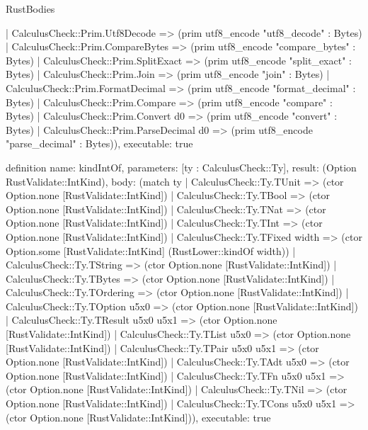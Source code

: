 \begin{lexlean}{RustBodies}
\begin{semanticmodule}
{    | CalculusCheck::Prim.Utf8Decode => (prim utf8_encode "utf8_decode" : Bytes)
    | CalculusCheck::Prim.CompareBytes => (prim utf8_encode "compare_bytes" : Bytes)
    | CalculusCheck::Prim.SplitExact => (prim utf8_encode "split_exact" : Bytes)
    | CalculusCheck::Prim.Join => (prim utf8_encode "join" : Bytes)
    | CalculusCheck::Prim.FormatDecimal => (prim utf8_encode "format_decimal" : Bytes)
    | CalculusCheck::Prim.Compare => (prim utf8_encode "compare" : Bytes)
    | CalculusCheck::Prim.Convert d0 => (prim utf8_encode "convert" : Bytes)
    | CalculusCheck::Prim.ParseDecimal d0 => (prim utf8_encode "parse_decimal" : Bytes)),
  executable: true
}

definition{
  name: kindIntOf,
  parameters: [ty : CalculusCheck::Ty],
  result: (Option RustValidate::IntKind),
  body: (match ty
    | CalculusCheck::Ty.TUnit => (ctor Option.none [RustValidate::IntKind])
    | CalculusCheck::Ty.TBool => (ctor Option.none [RustValidate::IntKind])
    | CalculusCheck::Ty.TNat => (ctor Option.none [RustValidate::IntKind])
    | CalculusCheck::Ty.TInt => (ctor Option.none [RustValidate::IntKind])
    | CalculusCheck::Ty.TFixed width => (ctor Option.some [RustValidate::IntKind] (RustLower::kindOf width))
    | CalculusCheck::Ty.TString => (ctor Option.none [RustValidate::IntKind])
    | CalculusCheck::Ty.TBytes => (ctor Option.none [RustValidate::IntKind])
    | CalculusCheck::Ty.TOrdering => (ctor Option.none [RustValidate::IntKind])
    | CalculusCheck::Ty.TOption u5x0 => (ctor Option.none [RustValidate::IntKind])
    | CalculusCheck::Ty.TResult u5x0 u5x1 => (ctor Option.none [RustValidate::IntKind])
    | CalculusCheck::Ty.TList u5x0 => (ctor Option.none [RustValidate::IntKind])
    | CalculusCheck::Ty.TPair u5x0 u5x1 => (ctor Option.none [RustValidate::IntKind])
    | CalculusCheck::Ty.TAdt u5x0 => (ctor Option.none [RustValidate::IntKind])
    | CalculusCheck::Ty.TFn u5x0 u5x1 => (ctor Option.none [RustValidate::IntKind])
    | CalculusCheck::Ty.TNil => (ctor Option.none [RustValidate::IntKind])
    | CalculusCheck::Ty.TCons u5x0 u5x1 => (ctor Option.none [RustValidate::IntKind])),
  executable: true
}


\end{semanticmodule}
\end{lexlean}
